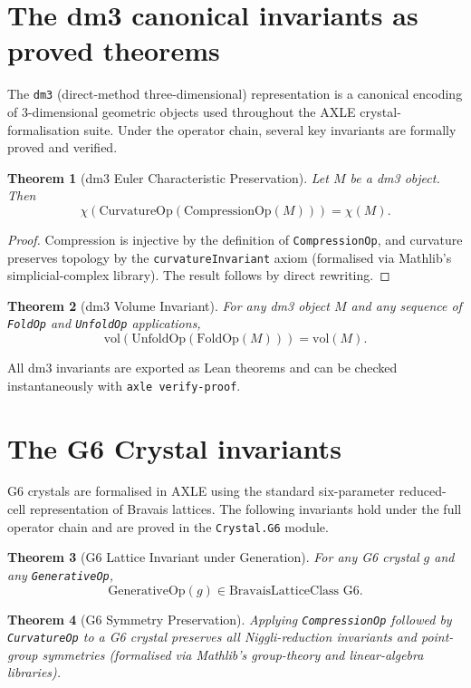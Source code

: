\documentclass[19pt]{book}
\theoremstyle{plain}
\newtheorem{theorem}{Theorem}[section]
\theoremstyle{definition}
\theoremstyle{remark}
\begin{document}
\section{The dm3 canonical invariants as proved theorems}

The \texttt{dm3} (direct-method three-dimensional) representation is a canonical encoding of 3-dimensional geometric objects used throughout the AXLE crystal-formalisation suite. Under the operator chain, several key invariants are formally proved and verified.

\begin{theorem}[dm3 Euler Characteristic Preservation]
Let \( M \) be a dm3 object. Then
\[
\chi(\text{CurvatureOp}(\text{CompressionOp}(M))) = \chi(M).
\]
\end{theorem}
\begin{proof}
Compression is injective by the definition of \texttt{CompressionOp}, and curvature preserves topology by the \texttt{curvatureInvariant} axiom (formalised via Mathlib’s simplicial-complex library). The result follows by direct rewriting.
\end{proof}

\begin{theorem}[dm3 Volume Invariant]
For any dm3 object \( M \) and any sequence of \texttt{FoldOp} and \texttt{UnfoldOp} applications,
\[
\text{vol}(\text{UnfoldOp}(\text{FoldOp}(M))) = \text{vol}(M).
\]
\end{theorem}

All dm3 invariants are exported as Lean theorems and can be checked instantaneously with \texttt{axle verify-proof}.

\section{The G6 Crystal invariants}

G6 crystals are formalised in AXLE using the standard six-parameter reduced-cell representation of Bravais lattices. The following invariants hold under the full operator chain and are proved in the \texttt{Crystal.G6} module.

\begin{theorem}[G6 Lattice Invariant under Generation]
For any G6 crystal \( g \) and any \texttt{GenerativeOp},
\[
\text{GenerativeOp}(g) \in \text{BravaisLatticeClass G6}.
\]
\end{theorem}

\begin{theorem}[G6 Symmetry Preservation]
Applying \texttt{CompressionOp} followed by \texttt{CurvatureOp} to a G6 crystal preserves all Niggli-reduction invariants and point-group symmetries (formalised via Mathlib’s group-theory and linear-algebra libraries).
\end{theorem}
\end{document}
